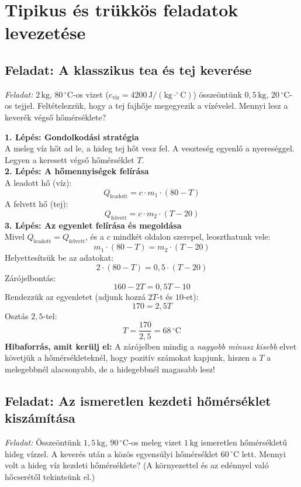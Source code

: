 \documentclass[11pt,a4paper]{article}
\begin{document}
\section{Tipikus és trükkös feladatok levezetése}

\subsection{Feladat: A klasszikus tea és tej keverése}
\textit{Feladat:} $2\,\text{kg}$, $80\,^\circ\text{C}$-os vizet ($c_{\text{víz}} = 4200\,\text{J}/(\text{kg}\cdot^\circ\text{C})$) összeöntünk $0{,}5\,\text{kg}$, $20\,^\circ\text{C}$-os tejjel. Feltételezzük, hogy a tej fajhője megegyezik a vízévelel. Mennyi lesz a keverék végső hőmérséklete?

\begin{tcolorbox}[title=Megoldási lépések]
\textbf{1. Lépés: Gondolkodási stratégia}\\
A meleg víz hőt ad le, a hideg tej hőt vesz fel. A veszteség egyenlő a nyereséggel. Legyen a keresett végső hőmérséklet $T$.\\[6pt]
\textbf{2. Lépés: A hőmennyiségek felírása}\\
A leadott hő (víz): 
$$Q_{\text{leadott}} = c \cdot m_1 \cdot (80 - T)$$
A felvett hő (tej): 
$$Q_{\text{felvett}} = c \cdot m_2 \cdot (T - 20)$$
\textbf{3. Lépés: Az egyenlet felírása és megoldása}\\
Mivel $Q_{\text{leadott}} = Q_{\text{felvett}}$, és a $c$ mindkét oldalon szerepel, leoszthatunk vele:
$$m_1 \cdot (80 - T) = m_2 \cdot (T - 20)$$
Helyettesítsük be az adatokat:
$$2 \cdot (80 - T) = 0{,}5 \cdot (T - 20)$$
Zárójelbontás:
$$160 - 2T = 0{,}5T - 10$$
Rendezzük az egyenletet (adjunk hozzá $2T$-t és $10$-et):
$$170 = 2{,}5T$$
Osztás $2{,}5$-tel:
$$T = \frac{170}{2{,}5} = 68\,^\circ\text{C}$$
\textbf{Hibaforrás, amit kerülj el:} A zárójelben mindig a \textit{nagyobb mínusz kisebb} elvet követjük a hőmérsékleteknél, hogy pozitív számokat kapjunk, hiszen a $T$ a melegebbnél alacsonyabb, de a hidegebbnél magasabb lesz!
\end{tcolorbox}

\subsection{Feladat: Az ismeretlen kezdeti hőmérséklet kiszámítása}
\textit{Feladat:} Összeöntünk $1{,}5\,\text{kg}$, $90\,^\circ\text{C}$-os meleg vizet $1\,\text{kg}$ ismeretlen hőmérsékletű hideg vízzel. A keverés után a közös egyensúlyi hőmérséklet $60\,^\circ\text{C}$ lett. Mennyi volt a hideg víz kezdeti hőmérséklete? (A környezettel és az edénnyel való hőcserétől tekintsünk el.)
\end{document}
